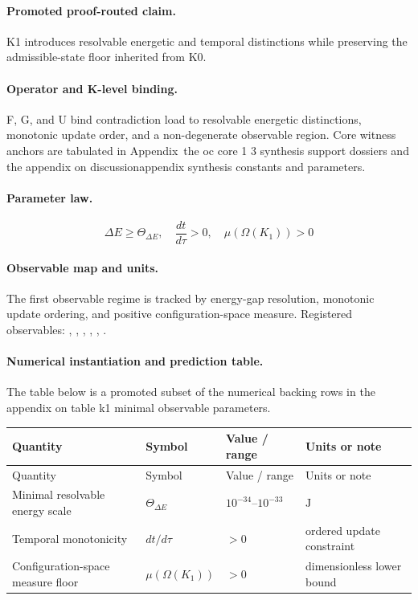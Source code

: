 \paragraph{Promoted proof-routed claim.}
K1 introduces resolvable energetic and temporal distinctions while preserving the admissible-state floor inherited from K0.

\paragraph{Operator and K-level binding.}
F, G, and U bind contradiction load to resolvable energetic distinctions, monotonic update order, and a non-degenerate observable region.
Core witness anchors are tabulated in Appendix~the oc core 1 3 synthesis support dossiers and the appendix on discussionappendix synthesis constants and parameters.

\paragraph{Parameter law.}
\[
\Delta E \geq \Theta_{\Delta E},\quad \frac{dt}{d\tau} > 0,\quad \mu(\Omega(K_1)) > 0
\]

\paragraph{Observable map and units.}
The first observable regime is tracked by energy-gap resolution, monotonic update ordering, and positive configuration-space measure.
Registered observables: , \allowbreak {}, \allowbreak {}, \allowbreak {}, \allowbreak {}, \allowbreak {}.

\paragraph{Numerical instantiation and prediction table.}
The table below is a promoted subset of the numerical backing rows in the appendix on table k1 minimal observable parameters.
\begin{longtable}{@{}L{0.27\textwidth}L{0.15\textwidth}L{0.24\textwidth}L{0.16\textwidth}@{}}
\toprule
Quantity & Symbol & Value / range & Units or note \\
\midrule
\endfirsthead
\toprule
Quantity & Symbol & Value / range & Units or note \\
\midrule
\endhead
Minimal resolvable energy scale & $\scriptstyle \Theta_{\Delta E}$ & $10^{-34}\text{--}10^{-33}$ & $\mathrm{J}$ \\
Temporal monotonicity & $\scriptstyle dt/\allowbreak d\tau$ & $> 0$ & ordered update constraint \\
Configuration-space measure floor & $\scriptstyle \mu(\Omega(K_1))$ & $> 0$ & dimensionless lower bound \\
\bottomrule
\end{longtable}

